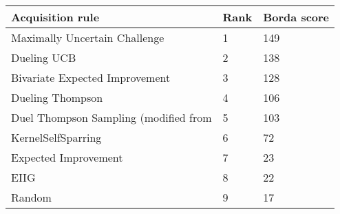 \begin{tabular}{lll}
Acquisition rule & Rank & Borda score \\ 
\hline 
Maximally Uncertain Challenge                                 & 1 & 149 \\ 
Dueling UCB \citep{Benavoli2020}                           & 2 & 138 \\ 
Bivariate Expected Improvement \citep{Nielsen2015}         & 3 & 128 \\ 
Dueling Thompson \citep{Benavoli2020}                      & 4 & 106 \\ 
Duel Thompson Sampling (modified from \citet{Gonzalez2017} & 5 & 103 \\ 
KernelSelfSparring \citep{Sui2017}                         & 6 & 72 \\ 
Expected Improvement \citep{Brochu2010a}                   & 7 & 23 \\ 
EIIG \citep{Benavoli2020}                                  & 8 & 22 \\ 
Random                                                     & 9 & 17 \\ 
\hline 
\end{tabular}